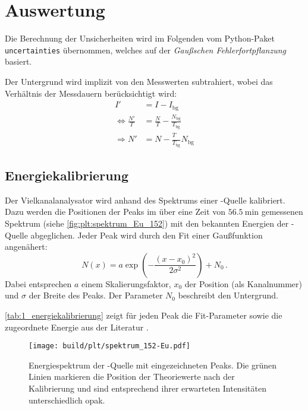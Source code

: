 \section{Auswertung}
\label{sec:auswertung}
Die Berechnung der Unsicherheiten wird im Folgenden vom Python-Paket \texttt{uncertainties} übernommen,
welches auf der \emph{Gaußschen Fehlerfortpflanzung} basiert.

Der Untergrund wird implizit von den Messwerten subtrahiert,
wobei das Verhältnis der Messdauern berücksichtigt wird:
\begin{align*}
    I' &= I - I_\text{bg} \\
    \Leftrightarrow
    \frac{N'}{T} &= \frac{N}{T} - \frac{N_\text{bg}}{T_\text{bg}} \\
    \Rightarrow
    N' &= N - \frac{T_{\phantom{\text{bg}}}}{T_\text{bg}} N_\text{bg}
\end{align*}


\subsection{Energiekalibrierung} \label{sec:auswertung:energiekalibrierung}
Der Vielkanalanalysator wird anhand des Spektrums einer -Quelle kalibriert.
Dazu werden die Positionen der Peaks im
    über eine Zeit von $\SI{56.5}{\minute}$ gemessenen
Spektrum (siehe \autoref{fig:plt:spektrum_Eu_152})
mit den bekannten Energien der -Quelle abgeglichen.
Jeder Peak wird durch den Fit einer Gaußfunktion angenähert:
\begin{equation}
    N(x) = a \exp\left(-\frac{(x - x_0)^2}{2 \sigma^2}\right) + N_0 \, .
    \label{eqn:gauss}
\end{equation}
Dabei entsprechen
    $a$ einem Skalierungsfaktor, %
    $x_0$ der Position (als Kanalnummer)
    und $\sigma$ der Breite
des Peaks.
Der Parameter $N_0$ beschreibt den Untergrund.

\autoref{tab:1_energiekalibrierung} zeigt für jeden Peak
    die Fit-Parameter sowie die zugeordnete Energie aus der Literatur \cite{lara}.

\begin{figure}
    \centering
    \texttt{[image: build/plt/spektrum\_152-Eu.pdf]}
    \caption{
        Energiespektrum der -Quelle mit eingezeichneten Peaks.
        Die grünen Linien markieren die Position der Theoriewerte \cite{lara} nach der Kalibrierung
        und sind entsprechend ihrer erwarteten Intensitäten unterschiedlich opak.
    }
    \label{fig:plt:spektrum_Eu_152}
\end{figure}

